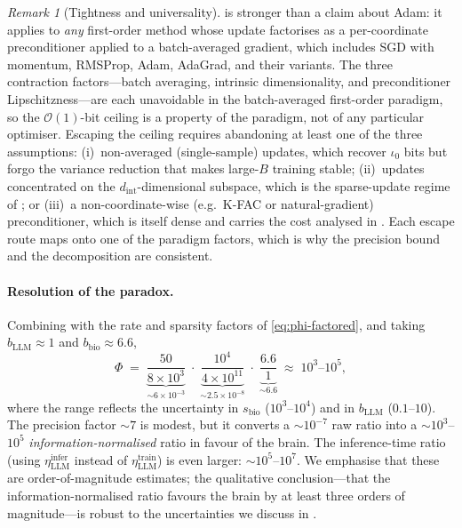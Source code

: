 \documentclass[11pt]{article}
\theoremstyle{definition}
\theoremstyle{remark}
\newtheorem{remark}[theorem]{Remark}
\begin{document}
\begin{remark}[Tightness and universality]
\label{rem:sgd-tight}
 is stronger than a claim about Adam: it applies
to \emph{any} first-order method whose update factorises as a
per-coordinate preconditioner applied to a batch-averaged gradient,
which includes SGD with momentum, RMSProp, Adam, AdaGrad, and their
variants.  The three contraction factors---batch averaging, intrinsic
dimensionality, and preconditioner Lipschitzness---are each
unavoidable in the batch-averaged first-order paradigm, so the
$\mathcal{O}(1)$-bit ceiling is a property of the paradigm, not of
any particular optimiser.  Escaping the ceiling requires abandoning
at least one of the three assumptions: (i)~non-averaged (single-sample)
updates, which recover $\iota_{0}$ bits but forgo the variance
reduction that makes large-$B$ training stable; (ii)~updates
concentrated on the $d_{\mathrm{int}}$-dimensional subspace, which is
the sparse-update regime of ; or (iii)~a
non-coordinate-wise (e.g.\ K-FAC or natural-gradient) preconditioner,
which is itself dense and carries the cost analysed in
.  Each escape route maps onto one of the paradigm
factors, which is why the precision bound and the decomposition are
consistent.
\end{remark}

\paragraph{Resolution of the paradox.}
Combining  with
the rate and sparsity factors of \cref{eq:phi-factored}, and taking
$b_{\mathrm{LLM}}\approx 1$ and $b_{\mathrm{bio}}\approx 6.6$,
\begin{equation}
  \Phi \;=\;
  \underbrace{\frac{50}{8\times 10^{3}}}_{\sim 6\times 10^{-3}}
  \;\cdot\;
  \underbrace{\frac{10^{4}}{4\times 10^{11}}}_{\sim 2.5\times 10^{-8}}
  \;\cdot\;
  \underbrace{\frac{6.6}{1}}_{\sim 6.6}
  \;\approx\; 10^{3}\text{--}10^{5},
  \label{eq:phi-final}
\end{equation}
where the range reflects the uncertainty in $s_{\mathrm{bio}}$
($10^{3}$--$10^{4}$) and in $b_{\mathrm{LLM}}$ ($0.1$--$10$).  The
precision factor $\sim\!7$ is modest, but it converts a
$\sim\!10^{-7}$ raw ratio into a $\sim\!10^{3}$--$10^{5}$
\emph{information-normalised} ratio in favour of the brain.  The
inference-time ratio (using $\eta_{\mathrm{LLM}}^{\mathrm{infer}}$
instead of $\eta_{\mathrm{LLM}}^{\mathrm{train}}$) is even larger:
$\sim\!10^{5}$--$10^{7}$.  We emphasise that these are
order-of-magnitude estimates; the qualitative conclusion---that the
information-normalised ratio favours the brain by at least three
orders of magnitude---is robust to the uncertainties we discuss in
.
\end{document}
